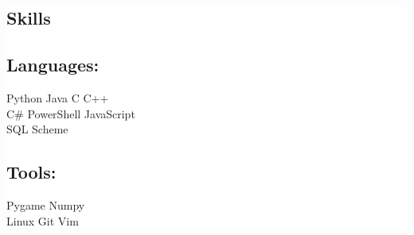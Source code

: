 \documentclass[letterpaper]{kevin-resume} %
\begin{document}
\hfill
%
%
\colorbox{background}{\hspace{2mm}\begin{minipage}[t]{0.30\textwidth} %
\hspace{5mm}

\section{Skills}

\subsection{Languages:}
Python \textbullet{}
Java \textbullet{}
C \textbullet{} 
C++ \\
C\# \textbullet{}
PowerShell \textbullet{}
JavaScript \\
SQL \textbullet{} 
Scheme

\sectionspace %

\subsection{Tools:}
Pygame \textbullet{}
Numpy \\
Linux \textbullet{}
Git \textbullet{}
Vim

\sectionspace %







\end{minipage}}
\end{document}
